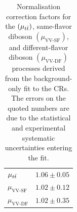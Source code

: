 \begin{table}[!htb]
    \begin{center}
        \caption{
            Normalisation correction factors for the \ttbar $(\mu_{t\bar{t}})$,
            same-flavor diboson $(\mu_{\text{VV-SF}})$, and different-flavor diboson $(\mu_{\text{VV-DF}})$
            processes derived from the background-only fit to the CRs.
            The errors on the quoted numbers are due to the statistical and experimental systematic uncertainties
            entering the fit.
        }
        \label{tab:stop_scalefactors}
        \begin{tabular}{l|c}
            \hline
            \hline
                $\mu_{t\bar{t}}$ & $1.06 \pm 0.05$ \\
                $\mu_{\text{VV-SF}}$ & $1.02 \pm 0.12$ \\
                $\mu_{\text{VV-DF}}$ & $1.02 \pm 0.35$ \\
            \hline
            \hline
        \end{tabular}
    \end{center}
\end{table}

